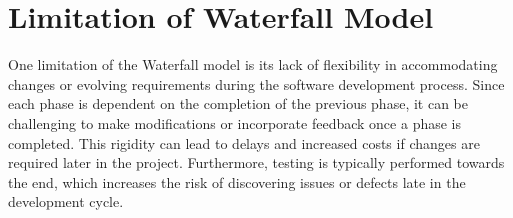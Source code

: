 \section{Limitation of Waterfall Model}
One limitation of the Waterfall model is its lack of flexibility in accommodating changes or evolving requirements during the software development process. Since each phase is dependent on the completion of the previous phase, it can be challenging to make modifications or incorporate feedback once a phase is completed. This rigidity can lead to delays and increased costs if changes are required later in the project.  Furthermore, testing is typically performed towards the end, which increases the risk of discovering issues or defects late in the development cycle.